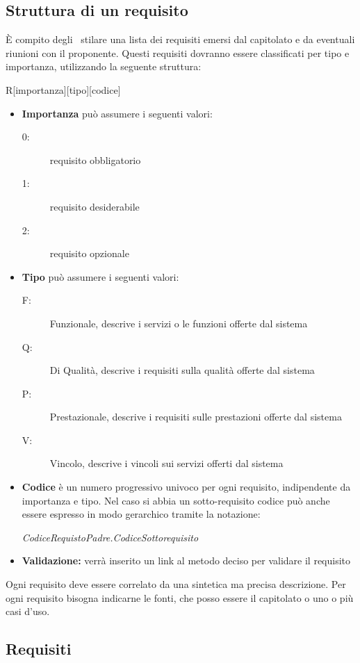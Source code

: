 \documentclass[12pt,a4paper]{article}
\begin{document}
\subsection{Struttura di un requisito}
È compito degli \ANpl\ stilare una lista dei requisiti emersi dal capitolato e da eventuali riunioni con il proponente. Questi requisiti dovranno essere classificati per tipo e importanza, utilizzando la seguente struttura:
\begin{center}
	R[importanza][tipo][codice]
\end{center}
\begin{itemize}
	\item \textbf{Importanza} può assumere i seguenti valori:
	\begin{description}
		\item[0:] requisito obbligatorio
		\item[1:] requisito desiderabile
		\item[2:] requisito opzionale
	\end{description}
	\item \textbf{Tipo} può assumere i seguenti valori:
	\begin{description}
		\item[F:] Funzionale, descrive i servizi o le funzioni offerte dal sistema
		\item[Q:] Di Qualità, descrive i requisiti sulla qualità offerte dal sistema
		\item[P:] Prestazionale, descrive i requisiti sulle prestazioni offerte dal sistema
		\item[V:] Vincolo, descrive i vincoli sui servizi offerti dal sistema
	\end{description}
	\item \textbf{Codice} è un numero progressivo univoco per ogni requisito, indipendente da importanza e tipo. Nel caso si abbia un sotto-requisito codice può anche essere espresso in modo gerarchico tramite la notazione:
	\begin{center}
		\textit{CodiceRequistoPadre.CodiceSottorequisito}
	\end{center}
	\item \textbf{Validazione:} verrà inserito un link al metodo deciso per validare il requisito
\end{itemize}
Ogni requisito deve essere correlato da una sintetica ma precisa descrizione. Per ogni requisito bisogna indicarne le fonti, che posso essere il capitolato o uno o più casi d'uso.

\subsection{Requisiti}

\newpage
\printglossary[title={Glossario}]
\end{document}
